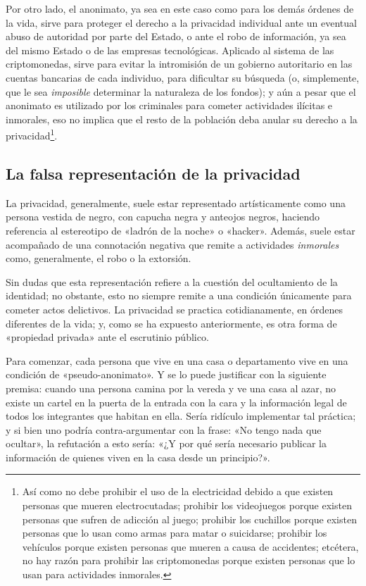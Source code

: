 \documentclass[12pt,a4paper,twoside]{book}
\begin{document}
Por otro lado, el anonimato, ya sea en este caso como para los demás órdenes de la vida, sirve para proteger el derecho a la privacidad individual ante un eventual abuso de autoridad por parte del Estado, o ante el robo de información, ya sea del mismo Estado o de las empresas tecnológicas. Aplicado al sistema de las criptomonedas, sirve para evitar la intromisión de un gobierno autoritario en las cuentas bancarias de cada individuo, para dificultar su búsqueda (o, simplemente, que le sea \textit{imposible} determinar la naturaleza de los fondos); y aún a pesar que el anonimato es utilizado por los criminales para cometer actividades ilícitas e inmorales, eso no implica que el resto de la población deba anular su derecho a la privacidad\footnote{Así como no debe prohibir el uso de la electricidad debido a que existen personas que mueren electrocutadas; prohibir los videojuegos porque existen personas que sufren de adicción al juego; prohibir los cuchillos porque existen personas que lo usan como armas para matar o suicidarse; prohibir los vehículos porque existen personas que mueren a causa de accidentes; etcétera, no hay razón para prohibir las criptomonedas porque existen personas que lo usan para actividades inmorales.}.

\subsection{La falsa representación de la privacidad}
La privacidad, generalmente, suele estar representado artísticamente como una persona vestida de negro, con capucha negra y anteojos negros, haciendo referencia al estereotipo de «ladrón de la noche» o «hacker». Además, suele estar acompañado de una connotación negativa que remite a actividades \textit{inmorales} como, generalmente, el robo o la extorsión.

Sin dudas que esta representación refiere a la cuestión del ocultamiento de la identidad; no obstante, esto no siempre remite a una condición únicamente para cometer actos delictivos. La privacidad se practica cotidianamente, en órdenes diferentes de la vida; y, como se ha expuesto anteriormente, es otra forma de «propiedad privada» ante el escrutinio público.

Para comenzar, cada persona que vive en una casa o departamento vive en una condición de «pseudo-anonimato». Y se lo puede justificar con la siguiente premisa: cuando una persona camina por la vereda y ve una casa al azar, no existe un cartel en la puerta de la entrada con la cara y la información legal de todos los integrantes que habitan en ella. Sería ridículo implementar tal práctica; y si bien uno podría contra-argumentar con la frase: «No tengo nada que ocultar», la refutación a esto sería: «¿Y por qué sería necesario publicar la información de quienes viven en la casa desde un principio?».
\end{document}
